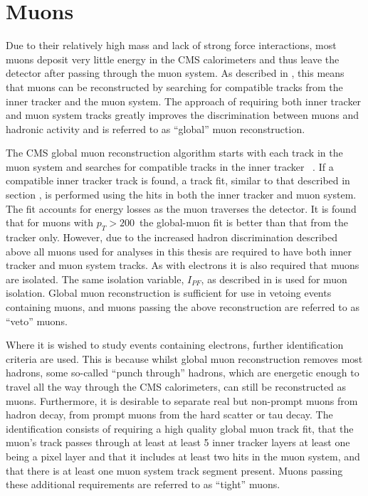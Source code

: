 \section{Muons}
\label{sec:muons}
Due to their relatively high mass and lack of strong force interactions, most muons deposit very little energy in the CMS calorimeters and thus leave the detector after passing through the muon system. As described in , this means that muons can be reconstructed by searching for compatible tracks from the inner tracker and the muon system. The approach of requiring both inner tracker and muon system tracks greatly improves the discrimination between muons and hadronic activity and is referred to as ``global'' muon reconstruction.

The CMS global muon reconstruction algorithm starts with each track in the muon system and searches for compatible tracks in the inner tracker ~\cite{MuonReco}. If a compatible inner tracker track is found, a track fit, similar to that described in section , is performed using the hits in both the inner tracker and muon system. The fit accounts for energy losses as the muon traverses the detector. It is found that for muons with $p_{T}>200$\GeV\, the global-muon fit is better than that from the tracker only. However, due to the increased hadron discrimination described above all muons used for analyses in this thesis are required to have both inner tracker and muon system tracks. As with electrons it is also required that muons are isolated. The same isolation variable, $I_{PF}$, as described in  is used for muon isolation. Global muon reconstruction is sufficient for use in vetoing events containing muons, and muons passing the above reconstruction are referred to as ``veto'' muons.

Where it is wished to study events containing electrons, further identification criteria are used. This is because whilst global muon reconstruction removes most hadrons, some so-called ``punch through'' hadrons, which are energetic enough to travel all the way through the CMS calorimeters, can still be reconstructed as muons. Furthermore, it is desirable to separate real but non-prompt muons from hadron decay, from prompt muons from the hard scatter or tau decay. The identification consists of requiring a high quality global muon track fit, that the muon's track passes through at least at least 5 inner tracker layers at least one being a pixel layer and that it includes at least two hits in the muon system, and that there is at least one muon system track segment present. Muons passing these additional requirements are referred to as ``tight'' muons.

